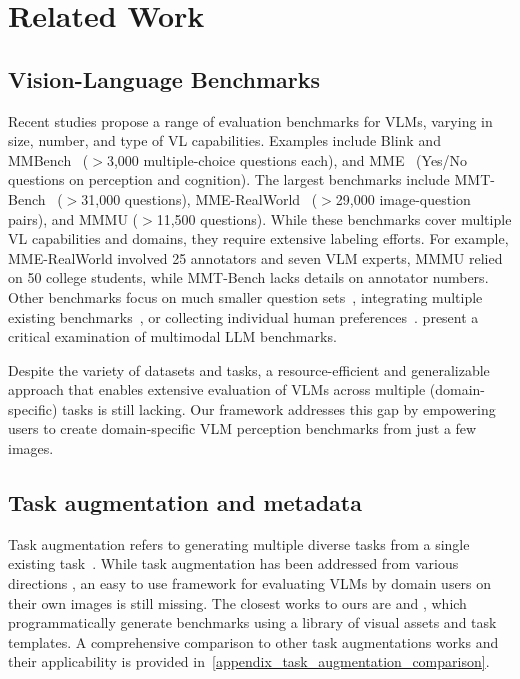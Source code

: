 \section{Related Work}
\label{sec:related_work}

\subsection{Vision-Language Benchmarks}
Recent studies propose a range of evaluation benchmarks for VLMs, varying in size, number, and type of VL capabilities. Examples include Blink \cite{fu2024blink} and MMBench~\cite{liu2024mmbench} ($>$3,000 multiple-choice questions each), and MME~\cite{fu2024mme} (Yes/No questions on perception and cognition). The largest benchmarks include MMT-Bench~\cite{ying2024mmtbench} ($>$31,000 questions), MME-RealWorld~\cite{zhang2024mmereal} ($>$29,000 image-question pairs), and MMMU \cite{yue2023mmmu} ($>$11,500 questions). While these benchmarks cover multiple VL capabilities and domains, they require extensive labeling efforts. For example, MME-RealWorld involved 25 annotators and seven VLM experts, MMMU relied on 50 college students, while MMT-Bench lacks details on annotator numbers. Other benchmarks focus on much smaller question sets~\cite{chen2024we, yu2024mm}, integrating multiple existing benchmarks~\cite{jiang2024eff,altahan2024unibench}, or collecting individual human preferences~\cite{lu2024wildvision,xu2023lvlmehub}. \citet{tong2024cambrian1fullyopenvisioncentric} present a critical examination of multimodal LLM benchmarks.

Despite the variety of datasets and tasks, a resource-efficient and generalizable approach that enables extensive evaluation of VLMs across multiple (domain-specific) tasks is still lacking. Our framework addresses this gap by empowering users to create domain-specific VLM perception benchmarks from just a few images.



\subsection{Task augmentation and metadata}
Task augmentation refers to generating multiple diverse tasks from a single existing task~\cite{muennighoff2023octopack}. While task augmentation has been addressed from various directions \cite{johnson2017clevr,zhang2024task, Zamir_2018_CVPR,wang2023instruct4v, wang2024journeybench,kuznetsova2020v4,krishna2017genome}, an easy to use framework for evaluating VLMs by domain users on their own images is still missing. The closest works to ours are \citet{zhang2024task} and \citet{zhang2024provision}, which programmatically generate benchmarks using a library of visual assets and task templates. A comprehensive comparison to other task augmentations works and their applicability is provided in~\cref{appendix_task_augmentation_comparison}.



